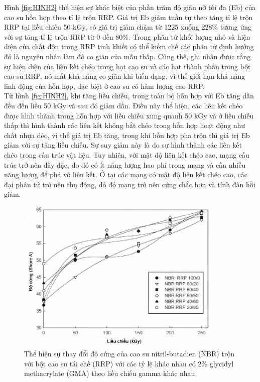 \documentclass[12pt,a4paper]{article}
\begin{document}
	Hình \ref{fig:HINH2} thể hiện sự khác biệt của phần trăm độ giãn nỡ tối đa (Eb) của cao su hỗn hợp theo tỉ lệ trộn RRP. Giá trị Eb giảm tuần tự theo tăng tỉ lệ trộn RRP tại liều chiếu 50 kGy, có giá trị giảm chậm từ 1225 xuống 228\% tương ứng với sự tăng tỉ lệ trộn RRP từ 0 đến 80\%. Trong phân tử khối lượng nhỏ và hiện diện của chất độn trong RRP tinh khiết có thể kiềm chế các phân tử định hướng đó là nguyên nhân làm độ co giãn của mẫu thấp. Cũng thế, ghi nhận được rằng sự hiện diện của liên kết chéo trong hạt cao su và các hạt thành phần trong bột cao su RRP, nó mất khả năng co giãn khi biến dạng, vì thế giới hạn khả năng linh động của hỗn hợp, đặc biệt ở cao su có hàm lượng cao RRP. \\
	
	
	Từ hình \ref{fig:HINH2}, khi tăng liều chiếu, trong toàn bộ hỗn hợp với Eb tăng dần đều đến liều 50 kGy và sau đó giảm dần. Điều này thể hiện, các liên kết chéo được hình thành trong hỗn hợp với liều chiếu xung quanh 50 kGy và ở liều chiếu thấp thì hình thành các liên kết không bắt chéo trong hỗn hợp hoạt động như chất nhựa dẻo, vì thế giá trị Eb tăng, trong khi hỗn hợp pha trộn thì giá trị Eb giảm với sự tăng liều chiếu. Sự suy giảm này là do sự hình thành các liên kết chéo trong cấu trúc vật liệu. Tuy nhiên, với mật độ liên kết chéo cao, mạng cấu trúc trở nên dày đặc, do đó có ít năng lượng hao phí trong mạng và cần nhiều năng lượng để phá vỡ liên kết. Ở tại các mạng có mật độ liên kết chéo cao, các đại phân tử trở nên thụ động, dó đó mạng trở nên cứng chắc hơn và tính đàn hồi giảm.
	
	\begin{figure}
		\centering
		\includegraphics[width=0.9\textwidth]{5.JPG}
		\caption{Thể hiện sự thay đổi độ cứng của cao su nitril-butadien (NBR) trộn với bột cao su tái chế (RRP) với các tỷ lệ khác nhau có 2\% glycidyl methacrylate (GMA) theo liều chiếu gamma khác nhau}
		\label{fig:HINH3}		
	\end{figure}	
	
\end{document}
